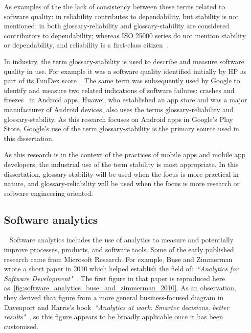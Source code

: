 As examples of the the lack of consistency between these terms related to software quality: in  reliability contributes to dependability, but stability is not mentioned; in
 both \gls{glossary-reliability} and \gls{glossary-stability} are considered contributors to dependability; whereas ISO 25000 series do not mention stability or dependability, and reliability is a first-class citizen~. 

In industry, the term \gls{glossary-stability} is used to describe and measure software quality in use. For example it was a software quality identified initially by HP as part of its FunDex score~. The same term was subsequently used by Google to identify and measure two related indications of software failures: crashes and freezes~ in Android apps. Huawei, who established an app store and was a major manufacturer of Android devices, also uses the terms \gls{glossary-reliability} and \gls{glossary-stability}.  As this research focuses on Android apps in Google's Play Store, Google's use of the term \gls{glossary-stability} is the primary source used in this dissertation.

As this research is in the context of the practices of mobile apps and mobile app developers, the industrial use of the term stability is most appropriate. In this dissertation, \gls{glossary-stability} will be used when the focus is more practical in nature, and \gls{glossary-reliability} will be used when the focus is more research or software engineering oriented.


\subsection{Software analytics}~\label{rw-software-analytics-topic}
Software analytics includes the use of analytics to measure and potentially improve processes, products, and software tools. Some of the early published research came from Microsoft Research. For example, Buse and Zimmerman wrote a short paper in 2010 which helped establish the field of:~\emph{``Analytics for Software Development"}~. The first figure in that paper is reproduced here as~\ref{fig:software_analytics_buse_and_zimmerman_2010}. As an observation, they derived that figure from a more general business-focused diagram in Davenport and Harris's book~\emph{``Analytics at work: Smarter decisions, better results"}~, so this figure appears to be broadly applicable once it has been customised. %

